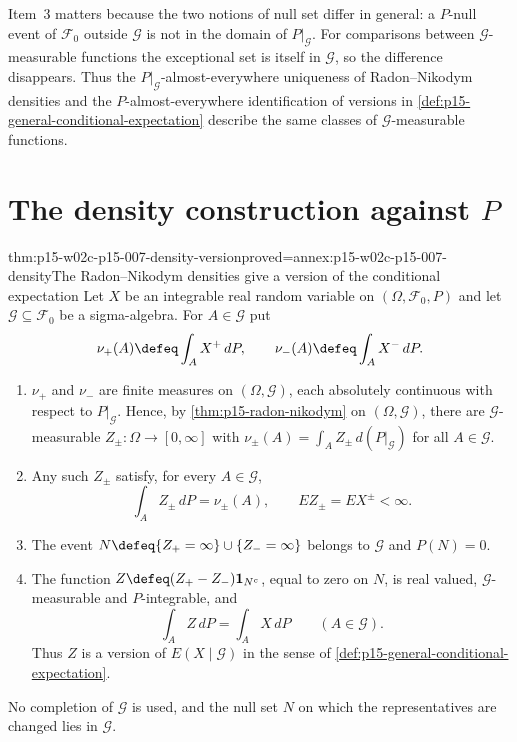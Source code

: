 Item~3 matters because the two notions of null set differ in general:
a \(P\)-null event of \(\mathcal F_0\) outside \(\mathcal G\) is not in the
domain of \(P|_{\mathcal G}\). For comparisons between
\(\mathcal G\)-measurable functions the exceptional set is itself in
\(\mathcal G\), so the difference disappears. Thus the
\(P|_{\mathcal G}\)-almost-everywhere uniqueness of Radon--Nikodym
densities and the \(P\)-almost-everywhere identification of versions in
\cref{def:p15-general-conditional-expectation} describe the same classes
of \(\mathcal G\)-measurable functions.

\section{The density construction against \(P\)}
\label{sec:p15-w02c-p15-007-construction}

\begin{hbtheorem}{thm:p15-w02c-p15-007-density-version}{proved=annex:p15-w02c-p15-007-density}{The Radon--Nikodym densities give a version of the conditional expectation}
Let \(X\) be an integrable real random variable on
\((\Omega,\mathcal F_0,P)\) and let \(\mathcal G\subseteq\mathcal F_0\) be
a sigma-algebra. For \(A\in\mathcal G\) put
\[
            \nu_+(A)\defeq\int_AX^+\,dP,\qquad
            \nu_-(A)\defeq\int_AX^-\,dP.
\]
\begin{enumerate}
\item \(\nu_+\) and \(\nu_-\) are finite measures on
      \((\Omega,\mathcal G)\), each absolutely continuous with respect to
      \(P|_{\mathcal G}\). Hence, by \cref{thm:p15-radon-nikodym} on
      \((\Omega,\mathcal G)\), there are \(\mathcal G\)-measurable
      \(Z_\pm:\Omega\to[0,\infty]\) with
      \(\nu_\pm(A)=\int_AZ_\pm\,d(P|_{\mathcal G})\) for all
      \(A\in\mathcal G\).
\item Any such \(Z_\pm\) satisfy, for every \(A\in\mathcal G\),
      \[
          \int_AZ_\pm\,dP=\nu_\pm(A),\qquad E Z_\pm=EX^\pm<\infty.
      \]
\item The event \(N\defeq\{Z_+=\infty\}\cup\{Z_-=\infty\}\) belongs to
      \(\mathcal G\) and \(P(N)=0\).
\item The function \(Z\defeq(Z_+-Z_-)\mathbf1_{N^c}\), equal to zero on
      \(N\), is real valued, \(\mathcal G\)-measurable and
      \(P\)-integrable, and
      \[
          \int_AZ\,dP=\int_AX\,dP\qquad(A\in\mathcal G).
      \]
      Thus \(Z\) is a version of \(E(X\mid\mathcal G)\) in the sense of
      \cref{def:p15-general-conditional-expectation}.
\end{enumerate}
No completion of \(\mathcal G\) is used, and the null set \(N\) on which
the representatives are changed lies in \(\mathcal G\).
\end{hbtheorem}

